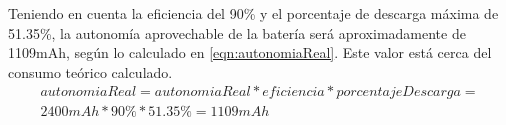 Teniendo en cuenta la eficiencia del 90\% y el porcentaje de descarga máxima de 51.35\%, la autonomía aprovechable de la batería será aproximadamente de 1109mAh, según lo calculado en \ref{eqn:autonomiaReal}.
Este valor está cerca del consumo teórico calculado. 
\begin{equation} \label{eqn:autonomiaReal}
\begin{split}
autonomiaReal = autonomiaReal*eficiencia*porcentajeDescarga = \\ 2400mAh * 90\% * 51.35\% = 1109 mAh
\end{split}
\end{equation}


